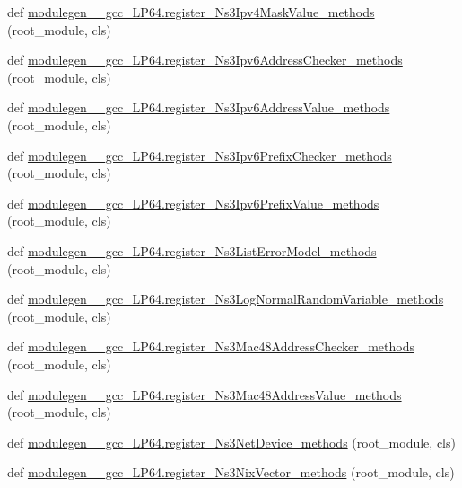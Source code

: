 \begin{DoxyCompactItemize}
\item 
def \hyperlink{namespacemodulegen____gcc__LP64_abcaf7e9c479182a07e377ce5e986a998}{modulegen\+\_\+\+\_\+gcc\+\_\+\+L\+P64.\+register\+\_\+\+Ns3\+Ipv4\+Mask\+Value\+\_\+methods} (root\+\_\+module, cls)
\item 
def \hyperlink{namespacemodulegen____gcc__LP64_ad1f9cec8b591983bb09444b16062156d}{modulegen\+\_\+\+\_\+gcc\+\_\+\+L\+P64.\+register\+\_\+\+Ns3\+Ipv6\+Address\+Checker\+\_\+methods} (root\+\_\+module, cls)
\item 
def \hyperlink{namespacemodulegen____gcc__LP64_ab829e3fded47f86a33a84e69215707ca}{modulegen\+\_\+\+\_\+gcc\+\_\+\+L\+P64.\+register\+\_\+\+Ns3\+Ipv6\+Address\+Value\+\_\+methods} (root\+\_\+module, cls)
\item 
def \hyperlink{namespacemodulegen____gcc__LP64_ab45b7cad858b5fb8fd4921640270716f}{modulegen\+\_\+\+\_\+gcc\+\_\+\+L\+P64.\+register\+\_\+\+Ns3\+Ipv6\+Prefix\+Checker\+\_\+methods} (root\+\_\+module, cls)
\item 
def \hyperlink{namespacemodulegen____gcc__LP64_a24017f7931b685270f9f9cae9dbc1f2e}{modulegen\+\_\+\+\_\+gcc\+\_\+\+L\+P64.\+register\+\_\+\+Ns3\+Ipv6\+Prefix\+Value\+\_\+methods} (root\+\_\+module, cls)
\item 
def \hyperlink{namespacemodulegen____gcc__LP64_a7865f02acd61587529dc614f3e28aff4}{modulegen\+\_\+\+\_\+gcc\+\_\+\+L\+P64.\+register\+\_\+\+Ns3\+List\+Error\+Model\+\_\+methods} (root\+\_\+module, cls)
\item 
def \hyperlink{namespacemodulegen____gcc__LP64_ae7aba903a40a328adf29c1a4e3b4c374}{modulegen\+\_\+\+\_\+gcc\+\_\+\+L\+P64.\+register\+\_\+\+Ns3\+Log\+Normal\+Random\+Variable\+\_\+methods} (root\+\_\+module, cls)
\item 
def \hyperlink{namespacemodulegen____gcc__LP64_a8b5d96f51d4bdc5d94489bcc0a50e648}{modulegen\+\_\+\+\_\+gcc\+\_\+\+L\+P64.\+register\+\_\+\+Ns3\+Mac48\+Address\+Checker\+\_\+methods} (root\+\_\+module, cls)
\item 
def \hyperlink{namespacemodulegen____gcc__LP64_aa62ae7526abc00b083df3d90589e2e92}{modulegen\+\_\+\+\_\+gcc\+\_\+\+L\+P64.\+register\+\_\+\+Ns3\+Mac48\+Address\+Value\+\_\+methods} (root\+\_\+module, cls)
\item 
def \hyperlink{namespacemodulegen____gcc__LP64_a2518a92fbd97a7666c5b4897eeb07c34}{modulegen\+\_\+\+\_\+gcc\+\_\+\+L\+P64.\+register\+\_\+\+Ns3\+Net\+Device\+\_\+methods} (root\+\_\+module, cls)
\item 
def \hyperlink{namespacemodulegen____gcc__LP64_a5cca2624411c350fed578acdd9616437}{modulegen\+\_\+\+\_\+gcc\+\_\+\+L\+P64.\+register\+\_\+\+Ns3\+Nix\+Vector\+\_\+methods} (root\+\_\+module, cls)

\end{DoxyCompactItemize}
